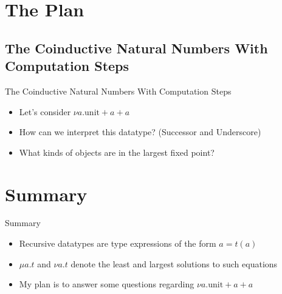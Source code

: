 \documentclass{beamer}
\begin{document}
\section{The Plan}

\subsection{The Coinductive Natural Numbers With Computation Steps}

\begin{frame}{The Coinductive Natural Numbers With Computation Steps}

  \begin{itemize}
    \item
      Let's consider $\nu a . \text{unit} + a + a$
    \item
      How can we interpret this datatype? (Successor and Underscore)
    \item
      What kinds of objects are in the largest fixed point?
  \end{itemize}

  \begin{center}
  \end{center}

\end{frame}


\section*{Summary}

\begin{frame}{Summary}

  \begin{itemize}
  \item
    Recursive datatypes are type expressions of the form $a = t(a)$
  \item
    $\mu a . t$ and $\nu a . t$ denote the least and largest solutions to such
    equations
  \item
    My plan is to answer some questions regarding $\nu a . \text{unit} + a + a$
  \end{itemize}

\end{frame}
\end{document}
